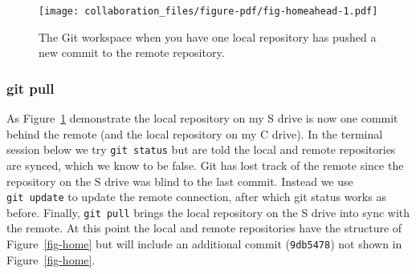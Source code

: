 \documentclass[
  letterpaper,
  DIV=11,
  numbers=noendperiod]{scrreprt}
\begin{document}
\begin{figure}

{\centering \texttt{[image: collaboration\_files/figure-pdf/fig-homeahead-1.pdf]}

}

\caption{\label{fig-homeahead}The Git workspace when you have one local
repository has pushed a new commit to the remote repository.}

\end{figure}

\hypertarget{git-pull}{%
\subsubsection{git pull}\label{git-pull}}

As Figure~\ref{fig-homeahead} demonstrate the local repository on my S
drive is now one commit behind the remote (and the local repository on
my C drive). In the terminal session below we try \texttt{git\ status}
but are told the local and remote repositories are synced, which we know
to be false. Git has lost track of the remote since the repository on
the S drive was blind to the last commit. Instead we use
\texttt{git\ update} to update the remote connection, after which git
status works as before. Finally, \texttt{git\ pull} brings the local
repository on the S drive into sync with the remote. At this point the
local and remote repositories have the structure of
Figure~\ref{fig-home} but will include an additional commit
(\texttt{9db5478}) not shown in Figure~\ref{fig-home}.
\end{document}
